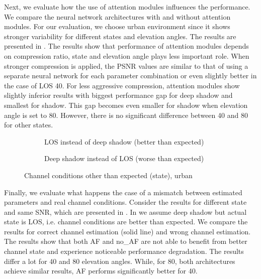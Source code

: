 \documentclass[conference]{IEEEtran}
\begin{document}
Next, we evaluate how the use of attention modules influences the performance.
We compare the neural network architectures with and without attention modules.
For our evaluation, we choose urban environment since it shows stronger variability for different states and elevation angles.
The results are presented in .
The results show that performance of attention modules depends on compression ratio, state and elevation angle plays less important role. 
When stronger compression is applied, the PSNR values are similar to that of using a separate neural network for each parameter combination or even slightly better in the case of LOS 40.
For less aggressive compression, attention modules show slightly inferior results with biggest performance gap for deep shadow and smallest for shadow. 
This gap becomes even smaller for shadow when elevation angle is set to 80. 
However, there is no significant difference between 40 and 80 for other states.



\begin{figure}[t!]
  \begin{subfigure}{.45\linewidth}
  \centering
  
  \vspace{-2.5em}
  \caption{LOS instead of deep shadow (better than expected)}
  \label{fig:different_state_same_snr_better}
\end{subfigure}
\vspace{1ex}
\begin{subfigure}{.45\linewidth}
  \centering
  
  \vspace{-2.5em}
  \caption{Deep shadow instead of LOS (worse than expected)}
  \label{fig:different_state_same_snr_worse}
\end{subfigure}
\caption{Channel conditions other than expected (state), urban}
\label{fig:different_state_same_snr}
\end{figure}



Finally, we evaluate what happens the case of a mismatch between estimated parameters and real channel conditions. 
Consider the results for different state and same SNR, which are presented in .
In  we assume deep shadow but actual state is LOS, i.e. channel conditions are better than expected. 
We compare the results for correct channel estimation (solid line) and wrong channel estimation.
The results show that both AF and no\_AF are not able to benefit from better channel state and experience noticeable performance degradation.
The results differ a lot for 40 and 80 elevation angles.
While, for 80, both architectures achieve similar results, 
AF performs significantly better for 40. 
\end{document}
